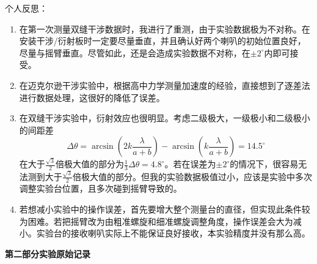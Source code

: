 \documentclass[11pt]{article}
\begin{document}
\noindent 个人反思：
\begin{enumerate}
    \item 在第一次测量双缝干涉数据时，我进行了重测，由于实验数据极为不对称。在安装干涉/衍射板时一定要尽量垂直，并且确认好两个喇叭的初始位置良好，尽量与摇臂垂直。尽管如此，还是会造成实验数据不对称，在$\pm 2^\circ$内即可接受。
    \item 在迈克尔逊干涉实验中，根据高中力学测量加速度的经验，直接想到了逐差法进行数据处理，这很好的降低了误差。
    \item 在双缝干涉实验中，衍射效应也很明显。考虑二级极大，一级极小和二级极小的间距差
    \[\Delta \theta =\arcsin\left(2k\frac{\lambda}{a+b}\right)-\arcsin\left(k\frac{\lambda}{a+b}\right)=14.5^\circ\]
    在大于$\frac{\sqrt{3}}{2}$倍极大值的部分为$\frac{1}{3}\Delta \theta=4.8^\circ$。若在误差为$\pm 2^\circ$的情况下，很容易无法测到大于$\frac{\sqrt{3}}{2}$倍极大值的部分。但我的实验数据极值过小，应该是实验中多次调整实验台位置，且多次碰到摇臂导致的。
    \item 若想减小实验中的操作误差，首先要增大整个测量台的直径，但实现此条件较为困难。若把摇臂改为由粗准螺旋和细准螺旋调整角度，操作误差会大为减小。实验台的接收喇叭实际上不能保证良好接收，本实验精度并没有那么高。
\end{enumerate}

\begin{center}
    \vspace*{1em}
    \Large \bf 第二部分\qquad 实验原始记录
\end{center}

\end{document}
